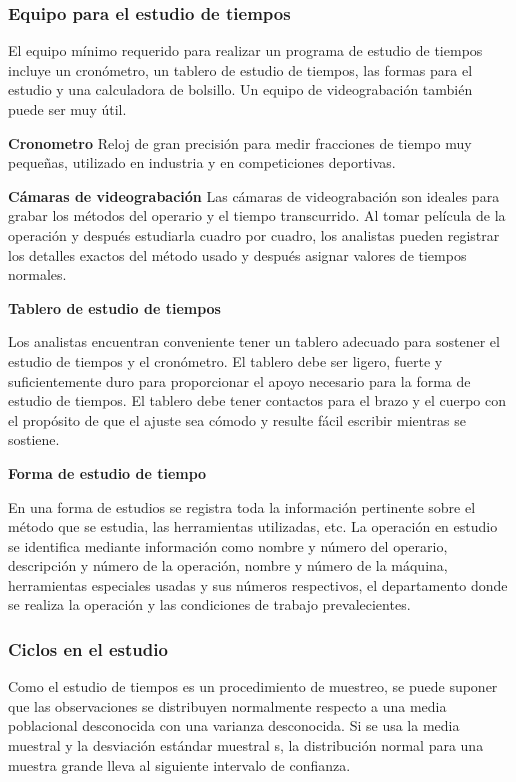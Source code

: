     \subsubsection{Equipo para el estudio de tiempos}
    
    El equipo mínimo requerido para realizar un programa de estudio de tiempos incluye un cronómetro, un tablero de estudio de tiempos, las formas para el estudio y una calculadora de bolsillo. Un equipo de videograbación también puede ser muy útil.
    
    \textbf{Cronometro}
    Reloj de gran precisión para medir fracciones de tiempo muy pequeñas, utilizado en industria y en competiciones deportivas.
    \cite{RAE}
    
    \textbf{Cámaras de videograbación}
    Las cámaras de videograbación son ideales para grabar los métodos del operario y el tiempo transcurrido. Al tomar película de la operación y después estudiarla cuadro por cuadro, los analistas pueden registrar los detalles exactos del método usado y después asignar valores de tiempos normales. 
    
    \textbf{Tablero de estudio de tiempos}
    
    Los analistas encuentran conveniente tener un tablero adecuado para sostener el estudio de tiempos y el cronómetro. El tablero debe ser ligero, fuerte y suficientemente duro para proporcionar el apoyo necesario para la forma de estudio de tiempos. El tablero debe tener contactos para el brazo y el cuerpo con el propósito de que el ajuste sea cómodo y resulte fácil escribir mientras se sostiene.
    
    \textbf{Forma de estudio de tiempo}
    
    En una forma de estudios se registra toda la información pertinente sobre el método que se estudia, las herramientas utilizadas, etc. La operación en estudio se identifica mediante información como nombre y número del operario, descripción y número de la operación, nombre y número de la máquina, herramientas especiales usadas y sus números respectivos, el departamento donde se realiza la operación y las condiciones de trabajo prevalecientes. 
    \cite{niebel1980ingenieria}
    
    \subsubsection{Ciclos en el estudio}
     Como el estudio de tiempos es un procedimiento de muestreo, se puede suponer que las observaciones se distribuyen normalmente respecto a una media poblacional desconocida con una varianza desconocida. Si se usa la media muestral y la desviación estándar muestral s, la distribución normal para una muestra grande lleva al siguiente intervalo de confianza.
    
